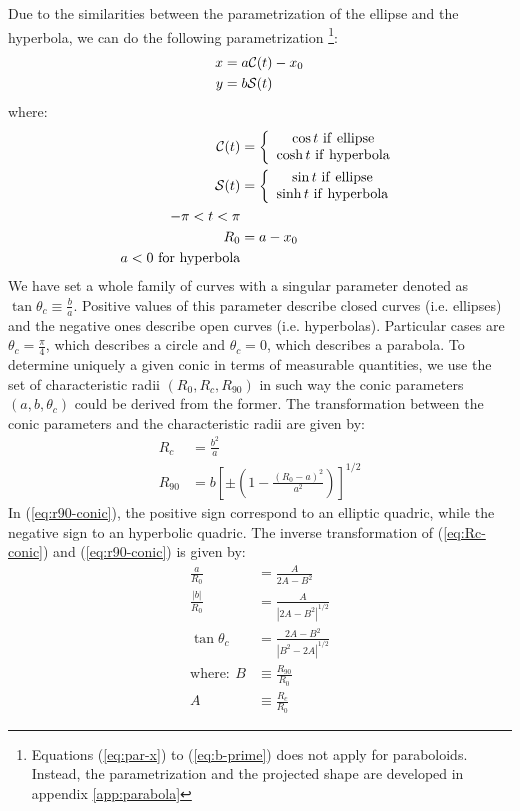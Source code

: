 Due to the similarities between the parametrization of the ellipse and the hyperbola, we can do the following parametrization
\footnote{Equations (\ref{eq:par-x}) to (\ref{eq:b-prime}) does not apply for paraboloids. Instead, the parametrization and the
  projected shape are developed in appendix \ref{app:parabola}}:
\begin{align}
x &= a\mathcal{C}(t)-x_0 \label{eq:par-x}\\ 
y &= b\mathcal{S}(t) \label{eq:par-y}
\end{align}
where:
\begin{align}
\mathcal{C}(t) &= \left\lbrace \begin{array}{c}
\cos t ~\mathrm{if~ellipse} \\
\cosh t ~\mathrm{if~hyperbola}
\end{array}\right.\\
\mathcal{S}(t) &= \left\lbrace \begin{array}{c}
\sin t ~\mathrm{if~ellipse} \\
\sinh t ~\mathrm{if~hyperbola}
\end{array}\right. \\
-\pi < t < \pi \\
R_0 &= a - x_0 \\
a<0 ~ \mathrm{for~hyperbola}
\end{align}
We have set a whole family of curves with a singular parameter denoted as $\tan\theta_c \equiv \frac{b}{a}$. Positive values of this parameter describe closed curves
(i.e. ellipses) and the negative ones describe open curves (i.e. hyperbolas). Particular cases are $\theta_c =\frac{\pi}{4}$, which describes a circle and $\theta_c=0$, which describes
a parabola.
To determine uniquely a given conic in terms of measurable quantities, we use the set of characteristic radii $(R_0,R_c,R_{90})$ in such way the conic parameters $(a,b,\theta_c)$
could be derived from the former. The transformation between the conic parameters and the characteristic radii are given by:
\begin{align}
R_c &= \frac{b^2}{a} \label{eq:Rc-conic}\\ 
R_{90} &= b\left[\pm\left(1 - \frac{(R_0-a)^2}{a^2}\right)\right]^{1/2}\label{eq:r90-conic}
\end{align}
In (\ref{eq:r90-conic}), the positive sign correspond to an elliptic quadric, while the negative sign to an hyperbolic quadric. The inverse transformation of (\ref{eq:Rc-conic})
and (\ref{eq:r90-conic}) is given by:
\begin{align}
\frac{a}{R_0} &= \frac{A}{2A-B^2} \label{eq:a-conic}\\
\frac{|b|}{R_0} &= \frac{A}{\left|2A-B^2\right|^{1/2}}\\
\tan\theta_c &= \frac{2A-B^2}{\left|B^2 - 2A\right|^{1/2}} \label{eq:thc-conic} \\
\mathrm{where:~} B &\equiv \frac{R_{90}}{R_0} \\
A &\equiv \frac{R_c}{R_0}
\end{align}

